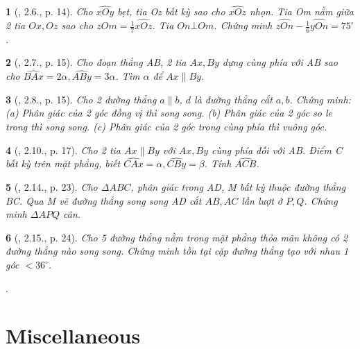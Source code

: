 \documentclass{article}
\newtheorem{baitoan}{}
\begin{document}
\begin{baitoan}[\cite{Hung_Mai_Toan_7_hinh_hoc}, 2.6., p. 14]
	Cho $\widehat{xOy}$ bẹt, tia Oz bất kỳ sao cho $\widehat{xOz}$ nhọn. Tia Om nằm giữa 2 tia $Ox,Oz$ sao cho $\widehat{zOm} = \frac{1}{7}\widehat{xOz}$. Tia $On\bot Om$. Chứng minh $\widehat{zOn} - \frac{1}{6}\widehat{yOn} = 75^\circ$.
\end{baitoan}

\begin{baitoan}[\cite{Hung_Mai_Toan_7_hinh_hoc}, 2.7., p. 15]
	Cho đoạn thẳng AB, 2 tia $Ax,By$ dựng cùng phía với AB sao cho $\widehat{BAx} = 2\alpha,\widehat{ABy} = 3\alpha$. Tìm $\alpha$ để $Ax\parallel By$.
\end{baitoan}

\begin{baitoan}[\cite{Hung_Mai_Toan_7_hinh_hoc}, 2.8., p. 15]
	Cho 2 đường thẳng $a\parallel b$, $d$ là đường thẳng cắt $a,b$. Chứng minh: (a) Phân giác của 2 góc đồng vị thì song song. (b) Phân giác của 2 góc so le trong thì song song. (c) Phân giác của 2 góc trong cùng phía thì vuông góc.
\end{baitoan}

\begin{baitoan}[\cite{Hung_Mai_Toan_7_hinh_hoc}, 2.10., p. 17]
	Cho 2 tia $Ax\parallel By$ với $Ax,By$ cùng phía đối với AB. Điểm C bất kỳ trên mặt phẳng, biết $\widehat{CAx} = \alpha,\widehat{CBy} = \beta$. Tính $\widehat{ACB}$.
\end{baitoan}

\begin{baitoan}[\cite{Hung_Mai_Toan_7_hinh_hoc}, 2.14., p. 23]
	Cho $\Delta ABC$, phân giác trong AD, M bất kỳ thuộc đường thẳng BC. Qua M vẽ đường thẳng song song AD cắt $AB,AC$ lần lượt ở $P,Q$. Chứng minh $\Delta APQ$ cân.
\end{baitoan}

\begin{baitoan}[\cite{Hung_Mai_Toan_7_hinh_hoc}, 2.15., p. 24]
	Cho 5 đường thẳng nằm trong mặt phẳng thỏa mãn không có 2 đường thẳng nào song song. Chứng minh tồn tại cặp đường thẳng tạo với nhau 1 góc $< 36^\circ$.
\end{baitoan}
\cite[2.9., p. 17, 2.11, p. 20, 2.12., p. 21, 2.13, p. 22]{Hung_Mai_Toan_7_hinh_hoc}.


\section{Miscellaneous}


\printbibliography[heading=bibintoc]
	
\end{document}
